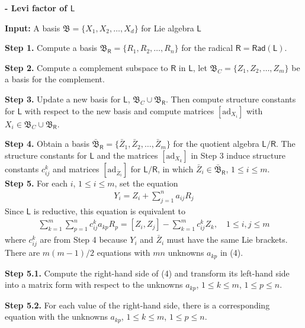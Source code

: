 \documentclass[11pt,a4paper]{article}
\begin{document}
\begin{algorithm}
\caption{\textbf{- Levi factor of $\mathsf{L}$}}
\begin{algorithmic}

\State \textbf{Input:} A basis $\mathfrak{B} = \{X_1, X_2, \dots, X_d \}$ for Lie algebra $\mathsf{L}$

\State \quad \textbf{Step 1.} Compute a basis $\mathfrak{B}_{\mathsf{R}} = \{R_1, R_2, \dots, R_n \}$ for the radical $\mathsf{R} = \mathsf{Rad}(\mathsf{L})$.

\State \quad \textbf{Step 2.} Compute a complement subspace to $\mathsf{R}$ in $\mathsf{L}$, let
$\mathfrak{B}_C = \{Z_1, Z_2, \dots, Z_m \}$ be a basis for the complement.

\State \quad \textbf{Step 3.} Update a new basis for $\mathsf{L}$, $\mathfrak{B}_C \cup \mathfrak{B}_{\mathsf{R}}$. Then compute structure constants for $\mathsf{L}$  with respect to the new basis and compute matrices $[\mathrm{ad}_{X_i}]$ with $X_i \in \mathfrak{B}_C \cup \mathfrak{B}_{\mathsf{R}}$.

\State \quad \textbf{Step 4.} Obtain a basis
$\bar{\mathfrak{B}}_{\mathsf{R}} = \{ \bar{Z}_1, \bar{Z}_2, \dots, \bar{Z}_m \}$ for the quotient algebra $\mathsf{L}/ \mathsf{R}$. The structure constants for $\mathsf{L}$ and the matrices $[\mathrm{ad}_{X_k}]$ in Step 3 induce structure constants $c^k_{ij}$ and matrices $[\mathrm{ad}_{\bar{Z}_i}]$ for $\mathsf{L}/ \mathsf{R}$, in which $\bar{Z}_i \in \bar{\mathfrak{B}}_{\mathsf{R}}$, $1 \leq i \leq m$.\\

\State \quad \textbf{Step 5.} For each $i$, $1 \leq i \leq m$, set the equation
\begin{align}
Y_i = Z_i + \sum_{j=1}^n a_{ij}R_j
\end{align} 
Since $\mathsf{L}$ is reductive, this equation is equivalent to
\begin{align} 
\sum_{k=1}^m \sum_{p=1}^n c^k_{ij} a_{kp} R_p = [Z_i,Z_j] -  \sum_{k=1}^m c^k_{ij}Z_k, \quad 1 \leq i,j \leq m
\end{align} 
where $c^k_{ij}$ are from Step 4 because $Y_i$ and $\bar{Z}_i$ must have the same Lie brackets. There are $m(m-1)/2$ equations with $mn$ unknowns $a_{kp}$ in (4).

\State \qquad \quad \textbf{Step 5.1.} Compute the right-hand side of (4) and transform its left-hand side into a matrix form with respect to the unknowns $a_{kp}$, $1 \leq k \leq m$, $1 \leq p \leq n$.

\State \qquad \quad \textbf{Step 5.2.} For each value of the right-hand side, there is a corresponding equation with the unknowns $a_{kp}$, $1 \leq k \leq m$, $1 \leq p \leq n$.


\end{algorithmic}
\end{algorithm}
\end{document}
